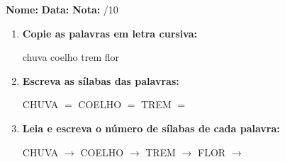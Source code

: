 \begin{exercicio}



\noindent\textbf{Nome:} \underline{\hspace{3.2cm}} \quad \textbf{Data:} \underline{\hspace{1.6cm}} \quad \textbf{Nota:} \underline{\hspace{0.9cm}}/10


\begin{enumerate}

  \item \textbf{Copie as palavras em letra cursiva:}
  \begin{center}
  chuva \quad coelho \quad trem \quad flor
  \end{center}
  \begin{center}
  \underline{\hspace{2.4cm}} \quad \underline{\hspace{2.4cm}} \quad \underline{\hspace{2.4cm}} \quad \underline{\hspace{2.4cm}}
  \end{center}

  \item \textbf{Escreva as sílabas das palavras:}
  \begin{center}
  CHUVA $=$ \underline{\hspace{1.5cm}} \underline{\hspace{1.5cm}} \quad COELHO $=$ \underline{\hspace{1.5cm}} \underline{\hspace{1.5cm}} \quad TREM $=$ \underline{\hspace{1.5cm}} \underline{\hspace{1.5cm}}
  \end{center}

  \item \textbf{Leia e escreva o número de sílabas de cada palavra:}
  \begin{center}
  CHUVA $\rightarrow$ \underline{\hspace{0.9cm}} \quad COELHO $\rightarrow$ \underline{\hspace{0.9cm}} \quad TREM $\rightarrow$ \underline{\hspace{0.9cm}} \quad FLOR $\rightarrow$ \underline{\hspace{0.9cm}}
  \end{center}


\end{enumerate}
\end{exercicio}
